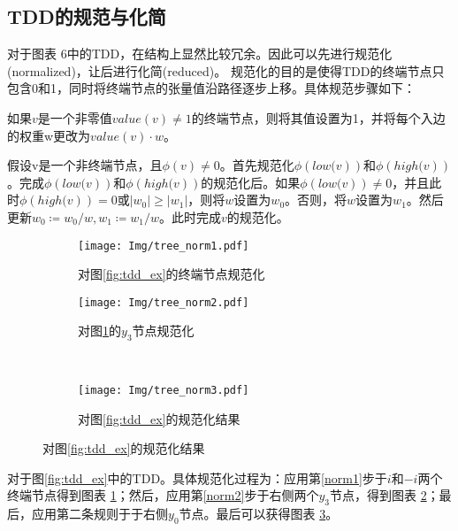 \subsection{TDD的规范与化简}
对于图表 6中的TDD，在结构上显然比较冗余。因此可以先进行规范化(normalized)，让后进行化简(reduced)\citep{Hong_2022}。
规范化的目的是使得TDD的终端节点只包含0和1，同时将终端节点的张量值沿路径逐步上移。具体规范步骤如下：
\begin{myen}
    \item 如果$v$是一个非零值$value\left(v\right)\neq 1$的终端节点，则将其值设置为1，并将每个入边的权重w更改为$value\left(v\right)\cdot w$。\label{norm1}
    \item 假设v是一个非终端节点，且$\phi\left(v\right)\neq 0$。首先规范化$\phi\left.\left(low(v\right)\right)$和$\phi\left.\left(high(v\right)\right)$。完成$\phi\left.\left(low(v\right)\right)$和$\phi\left.\left(high(v\right)\right)$的规范化后。如果$\phi\left.\left(low(v\right)\right)\neq 0$，并且此时$\phi\left.\left(high(v\right)\right)=0$或$\left|w_0\right|\geq\left|w_1\right|$，则将$w$设置为$w_0$。否则，将$w$设置为$w_1$。然后更新$w_0≔w_0/w,w_1≔w_1/w$。此时完成$v$的规范化。\label{norm2}
\end{myen}

\begin{figure}[!htbp]
    \centering
    \begin{subfigure}[b]{0.4\textwidth}
        \centering
        \texttt{[image: Img/tree\_norm1.pdf]}
        \caption{对图\ref{fig:tdd_ex}的终端节点规范化}
        \label{fig:tdd-norma}
    \end{subfigure}
    \begin{subfigure}[b]{0.4\textwidth}
        \centering
        \texttt{[image: Img/tree\_norm2.pdf]}
        \caption{对图\ref{fig:tdd-norma}的$y_3$节点规范化}
        \label{fig:tdd-normb}
    \end{subfigure}
    \\
    \begin{subfigure}[b]{0.8\textwidth}
        \centering
        \texttt{[image: Img/tree\_norm3.pdf]}
        \caption{对图\ref{fig:tdd_ex}的规范化结果}
        \label{fig:tdd-normc}
    \end{subfigure}
    \label{fig:tdd-norm}
\end{figure}
对于图\ref{fig:tdd_ex}中的TDD。具体规范化过程为：应用第\ref{norm1}步于$i$和$-i$两个终端节点得到图表 \ref{fig:tdd-norma}；然后，应用第\ref{norm2}步于右侧两个$y_3$节点，得到图表 \ref{fig:tdd-normb}；最后，应用第二条规则于于右侧$y_0$节点。最后可以获得图表 \ref{fig:tdd-normc}。

